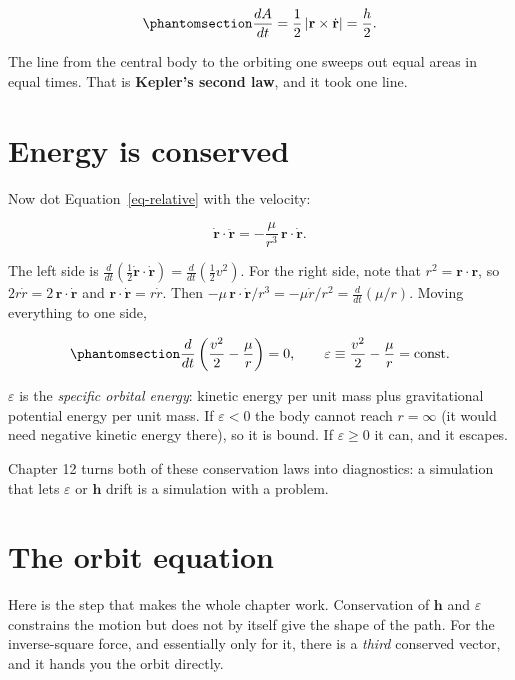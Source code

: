\documentclass[
  10.5pt,
  letterpaper,
]{scrbook}
\theoremstyle{definition}
\theoremstyle{plain}
\theoremstyle{remark}
\begin{document}
\begin{equation}\protect\phantomsection\label{eq-areal}{
\frac{dA}{dt} = \frac{1}{2}\,|\mathbf{r} \times \dot{\mathbf{r}}| = \frac{h}{2}.
}\end{equation}

The line from the central body to the orbiting one sweeps out equal
areas in equal times. That is \textbf{Kepler's second law}, and it took
one line.

\section{Energy is conserved}\label{energy-is-conserved}

Now dot Equation~\ref{eq-relative} with the velocity:

\[
\dot{\mathbf{r}}\cdot\ddot{\mathbf{r}} = -\frac{\mu}{r^3}\,\mathbf{r}\cdot\dot{\mathbf{r}}.
\]

The left side is
\(\frac{d}{dt}\left(\tfrac12 \dot{\mathbf{r}}\cdot\dot{\mathbf{r}}\right) = \frac{d}{dt}\left(\tfrac12 v^2\right)\).
For the right side, note that \(r^2 = \mathbf{r}\cdot\mathbf{r}\), so
\(2r\dot{r} = 2\,\mathbf{r}\cdot\dot{\mathbf{r}}\) and
\(\mathbf{r}\cdot\dot{\mathbf{r}} = r\dot{r}\). Then
\(-\mu\,\mathbf{r}\cdot\dot{\mathbf{r}}/r^3 = -\mu\dot{r}/r^2 = \frac{d}{dt}(\mu/r)\).
Moving everything to one side,

\begin{equation}\protect\phantomsection\label{eq-energy}{
\frac{d}{dt}\left(\frac{v^2}{2} - \frac{\mu}{r}\right) = 0, \qquad
\varepsilon \equiv \frac{v^2}{2} - \frac{\mu}{r} = \text{const}.
}\end{equation}

\(\varepsilon\) is the \emph{specific orbital energy}: kinetic energy
per unit mass plus gravitational potential energy per unit mass. If
\(\varepsilon < 0\) the body cannot reach \(r = \infty\) (it would need
negative kinetic energy there), so it is bound. If \(\varepsilon \ge 0\)
it can, and it escapes.

Chapter 12 turns both of these conservation laws into diagnostics: a
simulation that lets \(\varepsilon\) or \(\mathbf{h}\) drift is a
simulation with a problem.

\section{The orbit equation}\label{the-orbit-equation}

Here is the step that makes the whole chapter work. Conservation of
\(\mathbf{h}\) and \(\varepsilon\) constrains the motion but does not by
itself give the shape of the path. For the inverse-square force, and
essentially only for it, there is a \emph{third} conserved vector, and
it hands you the orbit directly.
\end{document}
